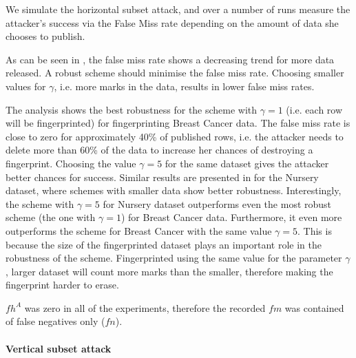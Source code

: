 \documentclass[runningheads]{llncs}
\begin{document}
We simulate the horizontal subset attack, and over a number of runs measure the attacker's success via the False Miss rate depending on the amount of data she chooses to publish.

As can be seen in , the false miss rate shows a decreasing trend for more data released.
A robust scheme should minimise the false miss rate.
Choosing smaller values for $\gamma$, i.e. more marks in the data, results in lower false miss rates.

The analysis shows the best robustness for the scheme with $\gamma=1$ (i.e. each row will be fingerprinted) for fingerprinting Breast Cancer data. The false miss rate is close to zero for approximately 40\% of published rows, i.e. the attacker needs to delete more than 60\% of the data to increase her chances of destroying a fingerprint.
Choosing the value $\gamma=5$ for the same dataset gives the attacker better chances for success.
Similar results are presented in  for the Nursery dataset, where schemes with smaller data show better robustness. 
Interestingly, the scheme with $\gamma=5$ for Nursery dataset outperforms even the most robust scheme (the one with $\gamma=1$) for Breast Cancer data. Furthermore, it even more outperforms the scheme for Breast Cancer with the same value $\gamma=5$. 
This is because the size of the fingerprinted dataset plays an important role in the robustness of the scheme.
Fingerprinted using the same value for the parameter $\gamma$, larger dataset will count more marks than the smaller, therefore making the fingerprint harder to erase.

$fh^A$ was zero in all of the experiments, therefore the recorded $fm$ was contained of false negatives only ($fn$). 

\paragraph{Vertical subset attack}

\end{document}
